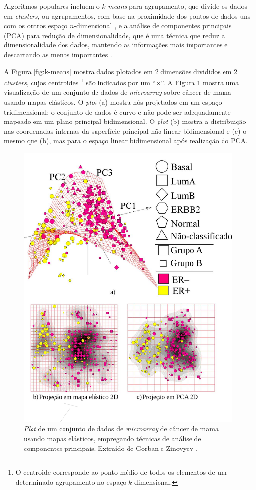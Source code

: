 \documentclass[
	12pt,				%
	openright,			%
	twoside,			%
	a4paper,			%
	tcc,			%
	]{ABNT-DC-UEL}
\begin{document}
Algoritmos populares incluem o $k$-\textit{means} para agrupamento, que divide os dados em \textit{clusters}, ou agrupamentos, com base na proximidade dos pontos de dados uns com os outros espaço $n$-dimensional \cite{alpaydin:20, mohammed:16}, e a análise de componentes principais (PCA) para redução de dimensionalidade, que é uma técnica que reduz a dimensionalidade dos dados, mantendo as informações mais importantes e descartando as menos importantes \cite{gorban:10}. 

A Figura \ref{fig:k-means} mostra dados plotados em 2 dimensões divididos em 2 \textit{clusters}, cujos centroides \footnote{O centroide corresponde ao ponto médio de todos os elementos de um determinado agrupamento no espaço $k$-dimensional.} são indicados por um ``$\times$''. A Figura \ref{fig:pca} mostra uma visualização de um conjunto de dados de \textit{microarray} sobre câncer de mama usando mapas elásticos. O \textit{plot} (a) mostra nós projetados em um espaço tridimensional; o conjunto de dados é curvo e não pode ser adequadamente mapeado em um plano principal bidimensional. O \textit{plot} (b) mostra a distribuição nas coordenadas internas da superfície principal não linear bidimensional e (c) o mesmo que (b), mas para o espaço linear bidimensional após realização do PCA.

\begin{figure}[hbt]
    \centering
    \includegraphics[width=.6\textwidth]{pca}
    \caption{\textit{Plot} de um conjunto de dados de \textit{microarray} de câncer de mama usando mapas elásticos, empregando técnicas de análise de componentes principais. Extraído de Gorban e Zinovyev \cite{gorban:10}.}
    \label{fig:pca}
\end{figure}
\end{document}
